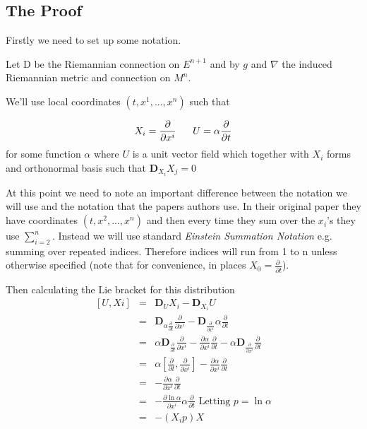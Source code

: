 \subsection{The Proof}
Firstly we need to set up some notation.

Let D be the Riemannian connection on $E^{n+1}$ and by $g$ and $\nabla$ the induced Riemannian metric and connection on $M^n$.

We'll use local coordinates $(t,x^1,...,x^n)$ such that

\begin{displaymath}
X_i = \frac{\partial}{\partial x^i} \mbox{\, \, \, \,} U = \alpha \frac{\partial}{\partial t}
\end{displaymath}
for some function $\alpha$
where $U$ is a unit vector field which together with $X_i$ forms and orthonormal basis such that $\mathbf D_{X_i}X_j = 0$

At this point we need to note an important difference between the notation we will use and the notation that the papers authors use. In their original paper they have coordinates $(t,x^2,...,x^n)$ and then every time they sum over the $x_i$'s they use $\sum_{i=2}^n$. Instead we will use standard \emph{Einstein Summation Notation} e.g. summing over repeated indices. Therefore indices will run from 1 to n unless otherwise specified (note that for convenience, in places $X_0 = \frac{\partial \ }{\partial t}$).

Then calculating the Lie bracket for this distribution 
\begin{eqnarray}
\nonumber
[U, Xi] &=& \mathbf D_U X_i - \mathbf D_{X_i} U \\
\nonumber
&=& \mathbf D_{\alpha \frac{\partial}{\partial t}} \frac{\partial}{\partial x^i} - \mathbf D_{\frac{\partial}{\partial x^i}}  \alpha \frac{\partial}{\partial t} \\
\nonumber
&=& \alpha \mathbf D_{\frac{\partial}{\partial t}}\frac{\partial}{\partial x^i}- \frac{\partial \alpha}{\partial x^i}\frac{\partial}{\partial t} - \alpha \mathbf D_{\frac{\partial}{\partial x^i}}\frac{\partial}{\partial t} \\
\nonumber
&=& \alpha \left[\frac{\partial}{\partial t},\frac{\partial}{\partial x^i}\right] - \frac{\partial \alpha}{\partial x^i}\frac{\partial}{\partial t} \\
\nonumber
&=& - \frac{\partial \alpha}{\partial x^i}\frac{\partial}{\partial t} \\
\nonumber
&=& - \frac{\partial \ln \alpha}{\partial x^i}\alpha\frac{\partial}{\partial t} \mbox{\ \ \ \ Letting } p = \ln \alpha \\
\nonumber
&=& -(X_i p)X
\end{eqnarray}


